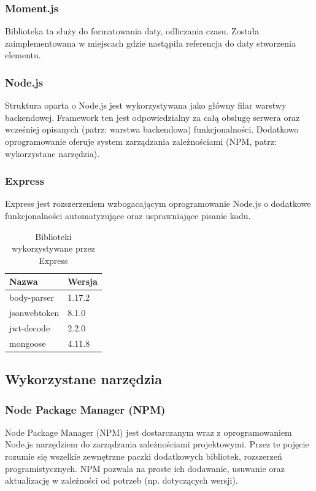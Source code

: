 \documentclass[eng,printmode]{mgr}
\begin{document}
\subsubsection{Moment.js}
Biblioteka ta\cite{MomentJS} służy do formatowania daty, odliczania czasu. Została zaimplementowana w miejscach gdzie nastąpiła referencja do daty stworzenia elementu.

\subsubsection{Node.js}
Struktura oparta o Node.js\cite{NodeJS} jest wykorzystywana jako główny filar warstwy backendowej. Framework ten jest odpowiedzialny za całą obsługę serwera oraz wcześniej opisanych (patrz: warstwa backendowa) funkcjonalności. Dodatkowo oprogramowanie oferuje system zarządzania zależnościami (NPM, patrz: wykorzystane narzędzia).

\subsubsection{Express}
Express\cite{Express} jest rozszerzeniem wzbogacającym oprogramowanie Node.js o dodatkowe funkcjonalności automatyzujące oraz usprawniające pisanie kodu.

\begin{table}[H]
\begin{tabularx}{\textwidth}{|X|X|}
   \hline
    \textbf{Nazwa} & \textbf{Wersja} \\
   \hline
     body-parser & 1.17.2 \\
   \hline
     jsonwebtoken & 8.1.0 \\
   \hline
  	 jwt-decode & 2.2.0 \\
   \hline
   	 mongoose & 4.11.8 \\
   \hline
\end{tabularx}
\caption{Biblioteki wykorzystywane przez Express}
\end{table}

\subsection{Wykorzystane narzędzia}

\subsubsection{Node Package Manager (NPM)}
Node Package Manager (NPM)\cite{NPM} jest dostarczanym wraz z oprogramowaniem Node.js narzędziem do zarządzania zależnościami projektowymi. Przez te pojęcie rozumie się wszelkie zewnętrzne paczki dodatkowych bibliotek, rozszerzeń programistycznych. NPM pozwala na proste ich dodawanie, usuwanie oraz aktualizację w zależności od potrzeb (np. dotyczących wersji).
\end{document}
